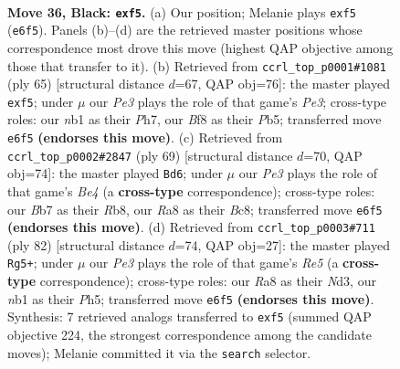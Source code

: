 \documentclass[11pt]{article}
\begin{document}
\clearpage

\begin{figure}[p]\centering
\begin{subfigure}{0.46\textwidth}\centering
\resizebox{\linewidth}{!}{%
\newchessgame
\chessboard[
  setfen={r4bn1/1bp1k3/p1p1p3/R4P2/8/8/3R4/1NB1K3 b - - 0 36},
  showmover=false,
  pgfstyle=straightmove, color=movearrow, markmove={e6-f5}
]}
\caption{}
\end{subfigure}\hfill
\begin{subfigure}{0.46\textwidth}\centering
\resizebox{\linewidth}{!}{%
\newchessgame
\chessboard[
  setfen={1r4k1/7p/2R1p3/1pp2P2/2b1B3/6bP/8/3R2K1 b - - 0 33},
  showmover=false,
  pgfstyle=straightmove, color=movearrow, markmove={e6-f5}
]}
\caption{}
\end{subfigure}
\\[4pt]
\begin{subfigure}{0.46\textwidth}\centering
\resizebox{\linewidth}{!}{%
\newchessgame
\chessboard[
  setfen={1rb4k/2p5/2R1p1Rp/pp2b2P/8/4K1P1/P7/1B6 b - - 1 35},
  showmover=false,
  pgfstyle=straightmove, color=movearrow, markmove={e5-d6}
]}
\caption{}
\end{subfigure}\hfill
\begin{subfigure}{0.46\textwidth}\centering
\resizebox{\linewidth}{!}{%
\newchessgame
\chessboard[
  setfen={3r4/5pk1/1bP5/1B1pR2P/P7/3N1K2/2r2P2/8 w - - 5 42},
  showmover=false,
  pgfstyle=straightmove, color=movearrow, markmove={e5-g5}
]}
\caption{}
\end{subfigure}
\caption{\textbf{Move 36, Black: \texttt{exf5}.} (a) Our position; Melanie plays \texttt{exf5} (\texttt{e6f5}). Panels (b)--(d) are the retrieved master positions whose correspondence most drove this move (highest QAP objective among those that transfer to it). (b) Retrieved from \texttt{ccrl\_top\_p0001\#1081} (ply 65) [structural distance $d$=67, QAP obj=76]: the master played \texttt{exf5}; under $\mu$ our \emph{Pe3} plays the role of that game's \emph{Pe3}; cross-type roles: our \emph{n}b1 as their \emph{P}h7, our \emph{B}f8 as their \emph{P}b5; transferred move \texttt{e6f5} \textbf{(endorses this move)}. (c) Retrieved from \texttt{ccrl\_top\_p0002\#2847} (ply 69) [structural distance $d$=70, QAP obj=74]: the master played \texttt{Bd6}; under $\mu$ our \emph{Pe3} plays the role of that game's \emph{Be4} (a \textbf{cross-type} correspondence); cross-type roles: our \emph{B}b7 as their \emph{R}b8, our \emph{R}a8 as their \emph{B}c8; transferred move \texttt{e6f5} \textbf{(endorses this move)}. (d) Retrieved from \texttt{ccrl\_top\_p0003\#711} (ply 82) [structural distance $d$=74, QAP obj=27]: the master played \texttt{Rg5+}; under $\mu$ our \emph{Pe3} plays the role of that game's \emph{Re5} (a \textbf{cross-type} correspondence); cross-type roles: our \emph{R}a8 as their \emph{N}d3, our \emph{n}b1 as their \emph{P}h5; transferred move \texttt{e6f5} \textbf{(endorses this move)}. Synthesis: 7 retrieved analogs transferred to \texttt{exf5} (summed QAP objective 224, the strongest correspondence among the candidate moves); Melanie committed it via the \texttt{search} selector.}
\label{fig:thought-m71}
\end{figure}
\end{document}
